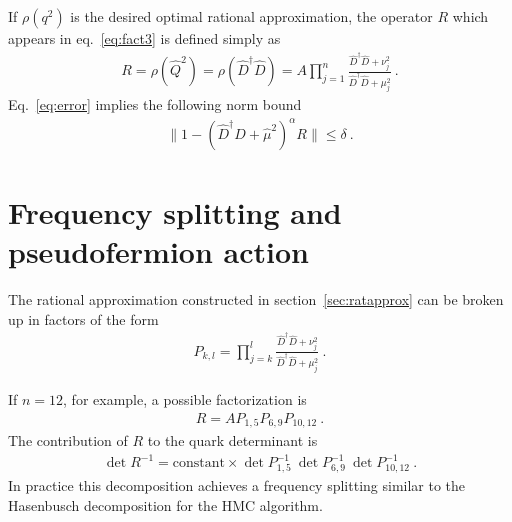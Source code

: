 \documentclass[11pt,fleqn]{article}
\newcommand{\Rmu}{R}
\begin{document}
If $\rho(q^2)$ is the desired optimal rational approximation, the operator $\Rmu$ which appears in eq.~\eqref{eq:fact3} is defined simply as
\begin{gather}
   \Rmu = \rho(\hat{Q}^2) = \rho(\hat{D}^\dag \hat{D}) =
   A \prod_{j=1}^n \frac{\hat{D}^\dag \hat{D} + \nu_j^2}{\hat{D}^\dag \hat{D} + \mu_j^2}
   \ .
\end{gather}
Eq.~\eqref{eq:error} implies the following norm bound
\begin{gather}
   \| 1 - (\hat{D}^\dag \hat{D} + \hat{\mu}^2)^{\alpha} \Rmu \| \le \delta \ .
   \label{eq:normbound}
\end{gather}



\section{Frequency splitting and pseudofermion action}

The rational approximation constructed in section~\ref{sec:ratapprox} can be broken up in factors of the form
\begin{gather}
   P_{k,l} = \prod_{j=k}^l \frac{\hat{D}^\dag \hat{D} + \nu_j^2}{\hat{D}^\dag \hat{D} + \mu_j^2} \ .
   \label{eq:Pfactor}
\end{gather}

If $n = 12$, for example, a possible factorization is 
\begin{gather}
   \Rmu = A P_{1,5} P_{6,9} P_{10,12} \ .
\end{gather}
The contribution of $\Rmu$ to the quark determinant is
\begin{gather}
   \det \Rmu^{-1} = \text{constant} \times \det P_{1,5}^{-1} \ \det P_{6,9}^{-1} \ \det P_{10,12}^{-1} \ .
\end{gather}
In practice this decomposition achieves a frequency splitting similar to the Hasenbusch decomposition for the HMC algorithm.
\end{document}
